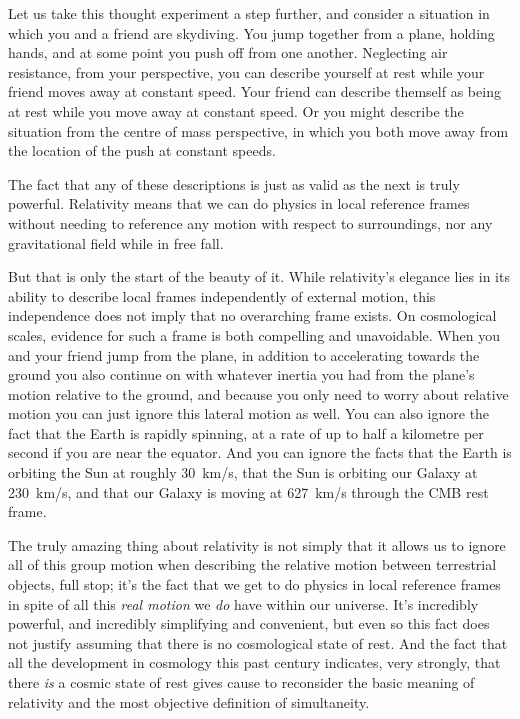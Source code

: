 \documentclass[aps,rmp,groupedaddress,twocolumn,10pt]{revtex4-2}
\begin{document}
Let us take this thought experiment a step further, and consider a situation in which you and a friend are skydiving. You jump together from a plane, holding hands, and at some point you push off from one another. Neglecting air resistance, from your perspective, you can describe yourself at rest while your friend moves away at constant speed. Your friend can describe themself as being at rest while you move away at constant speed. Or you might describe the situation from the centre of mass perspective, in which you both move away from the location of the push at constant speeds. 

The fact that any of these descriptions is just as valid as the next is truly powerful. Relativity means that we can do physics in local reference frames without needing to reference any motion with respect to surroundings, nor any gravitational field while in free fall.

But that is only the start of the beauty of it. While relativity's elegance lies in its ability to describe local frames independently of external motion, this independence does not imply that no overarching frame exists. On cosmological scales, evidence for such a frame is both compelling and unavoidable. When you and your friend jump from the plane, in addition to accelerating towards the ground you also continue on with whatever inertia you had from the plane's motion relative to the ground, and because you only need to worry about relative motion you can just ignore this lateral motion as well. You can also ignore the fact that the Earth is rapidly spinning, at a rate of up to half a kilometre per second if you are near the equator. And you can ignore the facts that the Earth is orbiting the Sun at roughly 30~km/s, that the Sun is orbiting our Galaxy at 230~km/s, and that our Galaxy is moving at 627~km/s through the CMB rest frame.

The truly amazing thing about relativity is not simply that it allows us to ignore all of this group motion when describing the relative motion between terrestrial objects, full stop; it's the fact that we get to do physics in local reference frames in spite of all this \textit{real motion} we \textit{do} have within our universe. It's incredibly powerful, and incredibly simplifying and convenient, but even so this fact does not justify assuming that there is no cosmological state of rest. And the fact that all the development in cosmology this past century indicates, very strongly, that there \textit{is} a cosmic state of rest gives cause to reconsider the basic meaning of relativity and the most objective definition of simultaneity. 
\end{document}

